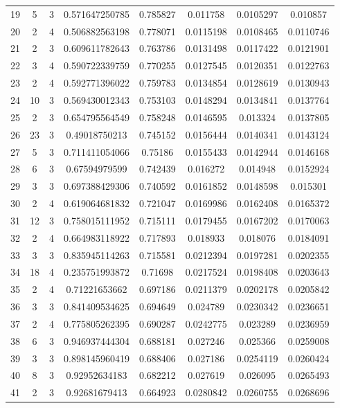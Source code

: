 \begin{longtable}{|c|c|c|c|c|c|c|c|}
19 & 5 & 3 & 0.571647250785 & 0.785827 & 0.011758 & 0.0105297 & 0.010857 \\
20 & 2 & 4 & 0.506882563198 & 0.778071 & 0.0115198 & 0.0108465 & 0.0110746 \\
21 & 2 & 3 & 0.609611782643 & 0.763786 & 0.0131498 & 0.0117422 & 0.0121901 \\
22 & 3 & 4 & 0.590722339759 & 0.770255 & 0.0127545 & 0.0120351 & 0.0122763 \\
23 & 2 & 4 & 0.592771396022 & 0.759783 & 0.0134854 & 0.0128619 & 0.0130943 \\
24 & 10 & 3 & 0.569430012343 & 0.753103 & 0.0148294 & 0.0134841 & 0.0137764 \\
25 & 2 & 3 & 0.654795564549 & 0.758248 & 0.0146595 & 0.013324 & 0.0137805 \\
26 & 23 & 3 & 0.49018750213 & 0.745152 & 0.0156444 & 0.0140341 & 0.0143124 \\
27 & 5 & 3 & 0.711411054066 & 0.75186 & 0.0155433 & 0.0142944 & 0.0146168 \\
28 & 6 & 3 & 0.67594979599 & 0.742439 & 0.016272 & 0.014948 & 0.0152924 \\
29 & 3 & 3 & 0.697388429306 & 0.740592 & 0.0161852 & 0.0148598 & 0.015301 \\
30 & 2 & 4 & 0.619064681832 & 0.721047 & 0.0169986 & 0.0162408 & 0.0165372 \\
31 & 12 & 3 & 0.758015111952 & 0.715111 & 0.0179455 & 0.0167202 & 0.0170063 \\
32 & 2 & 4 & 0.664983118922 & 0.717893 & 0.018933 & 0.018076 & 0.0184091 \\
33 & 3 & 3 & 0.835945114263 & 0.715581 & 0.0212394 & 0.0197281 & 0.0202355 \\
34 & 18 & 4 & 0.235751993872 & 0.71698 & 0.0217524 & 0.0198408 & 0.0203643 \\
35 & 2 & 4 & 0.71221653662 & 0.697186 & 0.0211379 & 0.0202178 & 0.0205842 \\
36 & 3 & 3 & 0.841409534625 & 0.694649 & 0.024789 & 0.0230342 & 0.0236651 \\
37 & 2 & 4 & 0.775805262395 & 0.690287 & 0.0242775 & 0.023289 & 0.0236959 \\
38 & 6 & 3 & 0.946937444304 & 0.688181 & 0.027246 & 0.025366 & 0.0259008 \\
39 & 3 & 3 & 0.898145960419 & 0.688406 & 0.027186 & 0.0254119 & 0.0260424 \\
40 & 8 & 3 & 0.92952634183 & 0.682212 & 0.027619 & 0.026095 & 0.0265493 \\
41 & 2 & 3 & 0.92681679413 & 0.664923 & 0.0280842 & 0.0260755 & 0.0268696 \\

\end{longtable}
